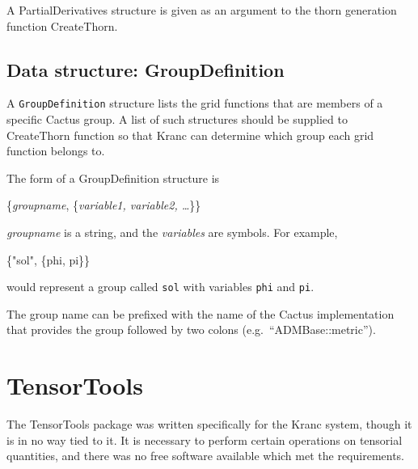 \documentclass{report}
\begin{document}
A PartialDerivatives structure is given as an argument to the thorn
generation function CreateThorn.

\subsection{Data structure: GroupDefinition}

A {\tt GroupDefinition} structure lists the grid functions that are
members of a specific Cactus group.  A list of such structures should
be supplied to CreateThorn function so that Kranc can determine which
group each grid function belongs to.

The form of a GroupDefinition structure is
\begin{center}
\begin{minipage}{0.8 \textwidth}
\begin{tt}
\{{\it groupname}, \{{\it variable1, variable2, \ldots}\}\}
\end{tt}
\end{minipage}
\end{center}
{\it groupname} is a string, and the {\it variables} are symbols.  For
example,
\begin{center}
\begin{minipage}{0.8 \textwidth}
\begin{tt}
\{"sol", \{phi, pi\}\}
\end{tt}
\end{minipage}
\end{center}
would represent a group called {\tt sol} with variables {\tt phi} and
{\tt pi}.

The group name can be prefixed with the name of the Cactus
implementation that provides the group followed by two colons
(e.g.~``ADMBase::metric'').


\section{TensorTools}

The TensorTools package was written specifically for the Kranc system,
though it is in no way tied to it.  It is necessary to perform certain
operations on tensorial quantities, and there was no free software
available which met the requirements.

\end{document}

